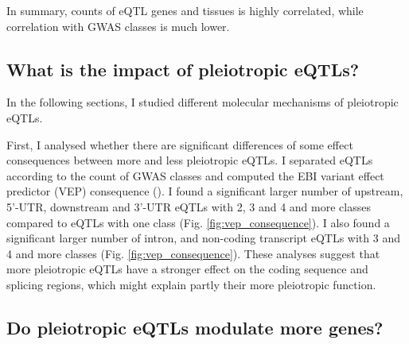 In summary, counts of eQTL genes and tissues is highly correlated, while correlation with GWAS classes is much lower.

%
\subsection*{What is the impact of pleiotropic eQTLs?}
%


In the following sections, I studied different molecular mechanisms of pleiotropic eQTLs.
%

First, I analysed whether there are significant differences of some effect consequences between more and less pleiotropic eQTLs.
%
I separated eQTLs according to the count of GWAS classes and computed the EBI variant effect predictor (VEP) consequence (\citep{2016.Cunningham.McLaren}).
%
I found a significant larger number of upstream, 5'-UTR, downstream and 3'-UTR eQTLs
with 2, 3 and 4 and more classes compared to eQTLs with one class (Fig. \ref{fig:vep_consequence}).
%
I also found a significant larger number of intron, and non-coding transcript eQTLs
with 3 and 4 and more classes (Fig. \ref{fig:vep_consequence}).
%
These analyses suggest that more pleiotropic eQTLs have a stronger effect on
the coding sequence and splicing regions, which might explain partly their more pleiotropic function.

%
\subsection*{Do pleiotropic eQTLs modulate more genes?}
%

